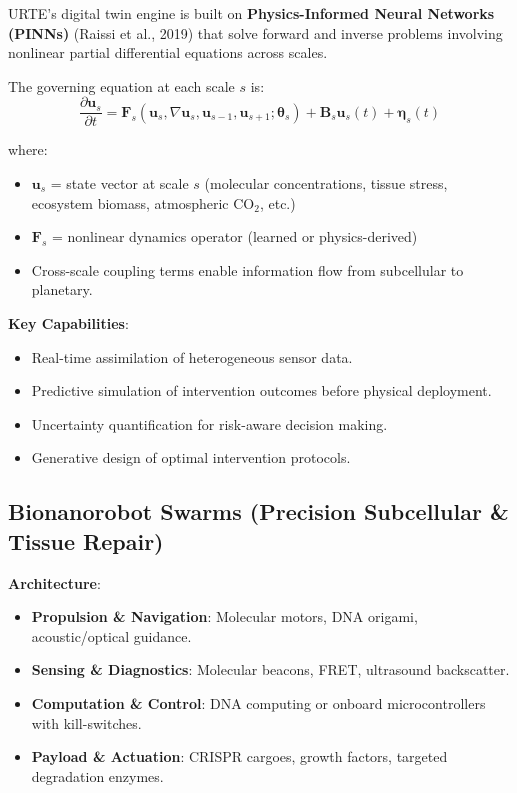 \documentclass[11pt,a4paper]{article}
\begin{document}
URTE's digital twin engine is built on \textbf{Physics-Informed Neural Networks (PINNs)} (Raissi et al., 2019) that solve forward and inverse problems involving nonlinear partial differential equations across scales.

The governing equation at each scale $s$ is:
\[
\frac{\partial \mathbf{u}_s}{\partial t} = \mathbf{F}_s(\mathbf{u}_s, \nabla \mathbf{u}_s, \mathbf{u}_{s-1}, \mathbf{u}_{s+1}; \boldsymbol{\theta}_s) + \mathbf{B}_s \mathbf{u}_s(t) + \boldsymbol{\eta}_s(t)
\]

where:
\begin{itemize}
    \item $\mathbf{u}_s$ = state vector at scale $s$ (molecular concentrations, tissue stress, ecosystem biomass, atmospheric CO$_2$, etc.)
    \item $\mathbf{F}_s$ = nonlinear dynamics operator (learned or physics-derived)
    \item Cross-scale coupling terms enable information flow from subcellular to planetary.
\end{itemize}

\textbf{Key Capabilities}:
\begin{itemize}
    \item Real-time assimilation of heterogeneous sensor data.
    \item Predictive simulation of intervention outcomes before physical deployment.
    \item Uncertainty quantification for risk-aware decision making.
    \item Generative design of optimal intervention protocols.
\end{itemize}

\subsection{Bionanorobot Swarms (Precision Subcellular \& Tissue Repair)}

\textbf{Architecture}:
\begin{itemize}
    \item \textbf{Propulsion \& Navigation}: Molecular motors, DNA origami, acoustic/optical guidance.
    \item \textbf{Sensing \& Diagnostics}: Molecular beacons, FRET, ultrasound backscatter.
    \item \textbf{Computation \& Control}: DNA computing or onboard microcontrollers with kill-switches.
    \item \textbf{Payload \& Actuation}: CRISPR cargoes, growth factors, targeted degradation enzymes.
\end{itemize}
\end{document}
